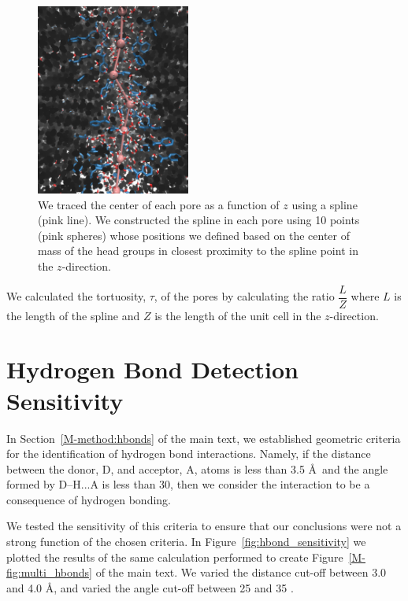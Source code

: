 \documentclass{article}
\begin{document}
  \begin{figure}[!htb]
  \centering
  \includegraphics[width=0.45\textwidth]{spline.pdf}
  \caption{We traced the center of each pore as a function of $z$ using a spline (pink
  line). We constructed the spline in each pore using 10 points (pink spheres) whose
  positions we defined based on the center of mass of the head groups in closest proximity
  to the spline point in the $z$-direction.}\label{fig:spline}
  \end{figure}
  
  We calculated the tortuosity, $\tau$, of the pores by calculating the 
  ratio $\dfrac{L}{Z}$ where $L$ is the length of the spline and $Z$ is 
  the length of the unit cell in the $z$-direction.

  \section{Hydrogen Bond Detection Sensitivity}\label{section:hbond_sensitivity}
  
  In Section~\ref{M-method:hbonds} of the main text, we established geometric criteria for the 
  identification of hydrogen bond interactions. Namely, if the distance between the donor,
  D, and acceptor, A, atoms is less than 3.5 \AA~and the angle formed by D--H...A is less
  than 30\degree, then we consider the interaction to be a consequence of hydrogen bonding.
  
  We tested the sensitivity of this criteria to ensure that our conclusions
  were not a strong function of the chosen criteria. In Figure~\ref{fig:hbond_sensitivity} we
  plotted the results of the same calculation performed to create Figure~\ref{M-fig:multi_hbonds}
  of the main text. We varied the distance cut-off between 3.0 and 4.0 \AA, and varied the
  angle cut-off between 25 and 35 \degree. 
  
\end{document}
